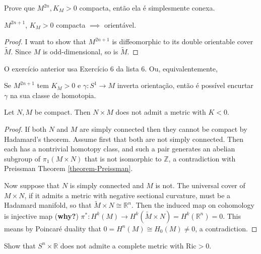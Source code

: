 \begin{exercise}
\label{exercise-even-dimension-positive-K-compact-is-simply-connected}
Prove que $M^{2n},K_M>0$ compacta, então ela é simplesmente conexa.
\end{exercise}

\begin{exercise}
\label{exercise-odd-dimension-positive-K-is-orientable}
$M^{2n+1}$, $K_M>0$ compacta $\implies$ orientável.
\end{exercise}

\begin{proof}
I want to show that $M^{2n+1}$ is diffeomorphic to its double orientable cover
 $\tilde{M}$. Since $M$ is odd-dimensional, so is $\tilde{M}$. 
\end{proof}

O exercício anterior usa Exercício 6 da lista 6. Ou, equivalentemente,

\begin{exercise}
\label{exercise-inverts-orientation-shortened}
Se $M^{2n+1}$ tem $K_M >0$ e $\gamma:S^1 \to M$ inverta orientação, então é
possível encurtar $\gamma$ na sua classe de homotopia.
\end{exercise}

\begin{exercise}
\label{exercise-product-of-compact-does-not-admit-negative-curvature}
Let $N,M$ be compact. Then $N \times M$ does not admit a metric with $K<0$.
\end{exercise}

\begin{proof}
If both $N$ and $M$ are simply connected then they cannot be compact by
Hadamard's theorem. Assume first that both are not simply connected. Then each
has a nontrivial homotopy class, and such a pair generates an abelian subgroup
of $\pi_1(M \times N)$ that is not isomorphic to $\mathbb{Z}$, a contradiction
with Preissman Theorem \ref{theorem-Preissman}.

Now suppose that $N$ is simply connected and $M$ is not. The universal cover of
$M\times N$, if it admits a metric with negative sectional curvature, 
must be a Hadamard manifold, so that $\tilde{M} \times N \cong \mathbb{R}^n$.
Then the induced map on cohomology is injective map ({\bf why?})
$\pi^* :H^{k}(M)\to H^{k}(\tilde{M} \times N)=H^{k}(\mathbb{R}^n)=0$. This means
by Poincaré duality that $0=H^{n}(M)\cong H_0(M)\neq 0$, a contradiction.
\end{proof}

\begin{exercise}
\label{exercise-SnxR-no-positive-Ric}
Show that $S^n \times \mathbb{R}$ does not admite a complete metric with
$\text{Ric}>0$.
\end{exercise}

